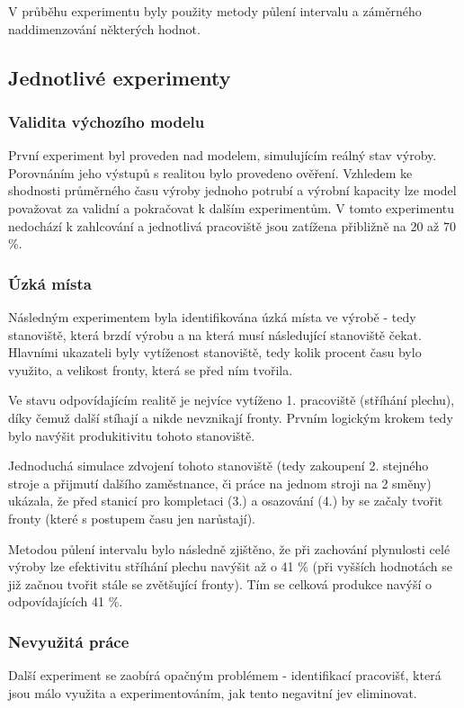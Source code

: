 \documentclass[11pt, a4paper]{article}
\begin{document}
V průběhu experimentu byly použity metody půlení intervalu a záměrného naddimenzování některých hodnot.

\subsection{Jednotlivé experimenty}

\subsubsection{Validita výchozího modelu}
První experiment byl proveden nad modelem, simulujícím reálný stav výroby. Porovnáním jeho výstupů s realitou bylo provedeno ověření. Vzhledem ke shodnosti průměrného času výroby jednoho potrubí a výrobní kapacity lze model považovat za validní a pokračovat k dalším experimentům. V tomto experimentu nedochází k zahlcování a jednotlivá pracoviště jsou zatížena přibližně na 20 až 70 \%.



\subsubsection{Úzká místa}
Následným experimentem byla identifikována úzká místa ve výrobě - tedy stanoviště, která brzdí výrobu a na která musí následující stanoviště čekat. Hlavními ukazateli byly vytíženost stanoviště, tedy kolik procent času bylo využito, a velikost fronty, která se před ním tvořila.

Ve stavu odpovídajícím realitě je nejvíce vytíženo 1. pracoviště (stříhání plechu), díky čemuž další stíhají a nikde nevznikají fronty. Prvním logickým krokem tedy bylo navýšit produkitivitu tohoto stanoviště.

Jednoduchá simulace zdvojení tohoto stanoviště (tedy zakoupení 2. stejného stroje a přijmutí dalšího zaměstnance, či práce na jednom stroji na 2 směny) ukázala, že před stanicí pro kompletaci (3.) a osazování (4.) by se začaly tvořit fronty (které s postupem času jen narůstají).

Metodou půlení intervalu bylo následně zjištěno, že při zachování plynulosti celé výroby lze efektivitu stříhání plechu navýšit až o 41 \% (při vyšších hodnotách se již začnou tvořit stále se zvětšující fronty). Tím se celková produkce navýší o odpovídajících 41 \%.

\subsubsection{Nevyužitá práce}
Další experiment se zaobírá opačným problémem - identifikací pracovišť, která jsou málo využita a experimentováním, jak tento negavitní jev eliminovat.
\end{document}
